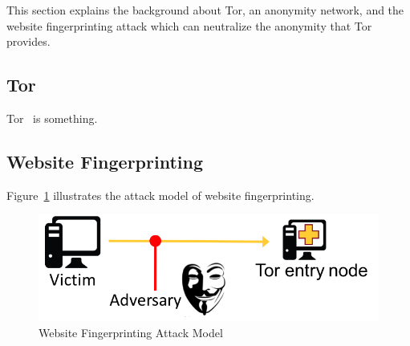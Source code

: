 
This section explains the background about Tor, an anonymity network, and the website fingerprinting attack which can neutralize the anonymity that Tor provides.

\subsection{Tor}
Tor~\cite{dingledine2004tor} is something.

\subsection{Website Fingerprinting}

Figure~\ref{fig:attack} illustrates the attack model of website fingerprinting.

\begin{figure}[h]
\includegraphics[width=0.7\columnwidth]{figures/attack_model.png}
\centering
\caption{Website Fingerprinting Attack Model}
\label{fig:attack}
\end{figure}

